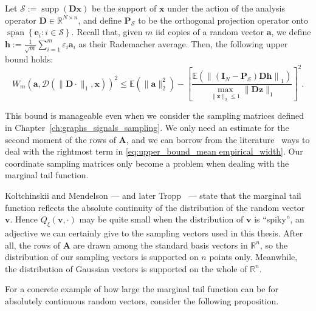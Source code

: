\begin{lemma}\label{lem:upper_bound_mean empirical_width}
    Let $\mathcal{S} := \operatorname{supp}\left ( \mathbf{Dx} \right )$ be the support of $\mathbf{x}$ under the action of the analysis operator $\mathbf{D} \in \mathbb{R}^{N \times n}$, and define $\mathbf{P}_\mathcal{S}$ to be the orthogonal projection operator onto $\operatorname{span}\left \{ \mathbf{e}_i : i \in \mathcal{S} \right \}$. Recall that, given $m$ \acrshort{iid} copies of a random vector $\mathbf{a}$, we define $\mathbf{h} := \frac{1}{\sqrt{m}} \sum_{i=1}^{m} \varepsilon_i \mathbf{a}_i$ as their Rademacher average. Then, the following upper bound holds:
    \begin{equation}
        W_{m}(\mathbf{a}, \mathcal{D}( \|\mathbf{D} \cdot \|_1, \mathbf{x}))^2 \leq \mathbb{E} \left ( \|\mathbf{a}\|_2^2 \right ) - \left [ \frac{\mathbb{E} \left ( \left \|(\mathbf{I}_N - \mathbf{P}_\mathcal{S}) \mathbf{Dh} \right \|_1 \right )}{\underset{\|\mathbf{z}\|_2 \leq 1}{\max} \| \mathbf{Dz} \|_1} \right ]^2.
        \label{eq:upper_bound_mean empirical_width}
    \end{equation}
\end{lemma}

This bound is manageable even when we consider the sampling matrices defined in Chapter~\ref{ch:graphs_signals_sampling}. We only need an estimate for the second moment of the rows of $\mathbf{A}$, and we can borrow from the literature~\cite{kabanava2015a} ways to deal with the rightmost term in \eqref{eq:upper_bound_mean empirical_width}. Our coordinate sampling matrices only become a problem when dealing with the marginal tail function.

Koltchinskii and Mendelson \cite{koltchinskii2015} --- and later Tropp~\cite{tropp2015a} --- state that the marginal tail function reflects the absolute continuity of the distribution of the random vector $\mathbf{v}$. Hence $Q_{\xi}(\mathbf{v}, \cdot)$ may be quite small when the distribution of $\mathbf{v}$ is ``spiky'', an adjective we can certainly give to the sampling vectors used in this thesis. After all, the rows of $\mathbf{A}$ are drawn among the standard basis vectors in $\mathbb{R}^{n}$, so the distribution of our sampling vectors is supported on $n$ points only. Meanwhile, the distribution of Gaussian vectors is supported on the whole of $\mathbb{R}^{n}$.

For a concrete example of how large the marginal tail function can be for absolutely continuous random vectors, consider the following proposition.


